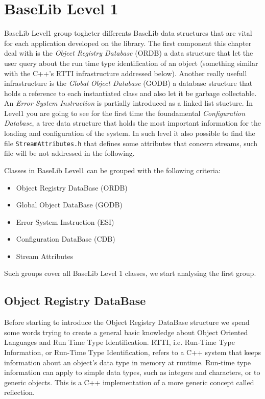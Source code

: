  \chapter{BaseLib Level 1}

BaseLib Level1 group togheter differents BaseLib data structures that are vital for each application developed on the library. The first component this chapter deal with is the \textit{Object Registry Database} (ORDB) a data structure that let the user query about the run time type identification of an object (something similar with the C++'s RTTI infrastructure addressed below).
Another really usefull infrastructure is the \textit{Global Object Database} (GODB) a database structure that holds a reference to each instantiated class and also let it be garbage collectable. An \textit{Error System Instruction} is partially introduced as a linked list stucture. In Level1 you are going to see for the first time the foundamental \textit{Configuration Database}, a tree data structure that holds the most important information for the loading and configuration of the system. In such level it also possible to find the file \texttt{StreamAttributes.h} that defines some attributes that concern streams, such file will be not addressed in the following.


Classes in BaseLib Level1 can be grouped with the following criteria:
\begin{itemize}
 \item Object Registry DataBase (ORDB)
 \item Global Object DataBase (GODB)
 \item Error System Instruction (ESI)
 \item Configuration DataBase (CDB)
 \item Stream Attributes
\end{itemize}
Such groups cover all BaseLib Level 1 classes, we start analysing the first group.



\section{Object Registry DataBase}
Before starting to introduce the Object Registry DataBase structure we spend some words trying to create a general basic knowledge about Object Oriented Languages and Run Time Type Identification. RTTI, i.e. Run-Time Type Information, or Run-Time Type Identification, refers to a C++ system that keeps information about an object's data type in memory at runtime. Run-time type information can apply to simple data types, such as integers and characters, or to generic objects. This is a C++ implementation of a more generic concept called reflection.



